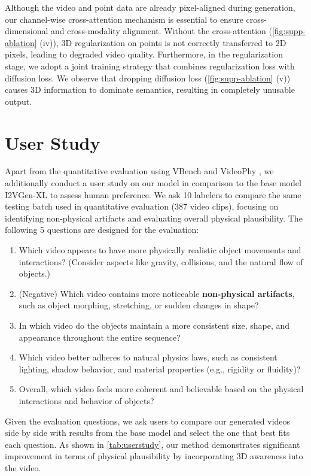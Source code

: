 \begin{appendix}
Although the video and point data are already pixel-aligned during generation, our channel-wise cross-attention mechanism is essential to ensure cross-dimensional and cross-modality alignment. Without the cross-attention (\autoref{fig:supp-ablation} (iv)), 3D regularization on points is not correctly transferred to 2D pixels, leading to degraded video quality. Furthermore, in the regularization stage, we adopt a joint training strategy that combines regularization loss with diffusion loss. We observe that dropping diffusion loss (\autoref{fig:supp-ablation} (v)) causes 3D information to dominate semantics, resulting in completely unusable output.


\section{User Study}
\label{sec:supp:userstudy}
Apart from the quantitative evaluation using VBench \cite{huang2024vbench} and VideoPhy \cite{bansal2024videophy}, we additionally conduct a user study on our model in comparison to the base model I2VGen-XL \cite{zhang2023i2vgen} to assess human preference. We ask 10 labelers to compare the same testing batch used in quantitative evaluation (387 video clips), focusing on identifying non-physical artifacts and evaluating overall physical plausibility. The following 5 questions are designed for the evaluation:

\begin{enumerate}
    \item Which video appears to have more physically realistic object movements and interactions? (Consider aspects like gravity, collisions, and the natural flow of objects.)
    \item (Negative) Which video contains more noticeable \textbf{non-physical artifacts}, such as object morphing, stretching, or sudden changes in shape?
    \item In which video do the objects maintain a more consistent size, shape, and appearance throughout the entire sequence?
    \item Which video better adheres to natural physics laws, such as consistent lighting, shadow behavior, and material properties (e.g., rigidity or fluidity)?
    \item Overall, which video feels more coherent and believable based on the physical interactions and behavior of objects?
\end{enumerate}

Given the evaluation questions, we ask users to compare our generated videos side by side with results from the base model and select the one that best fits each question. As shown in \autoref{tab:userstudy}, our method demonstrates significant improvement in terms of physical plausibility by incorporating 3D awareness into the video.


\end{appendix}
